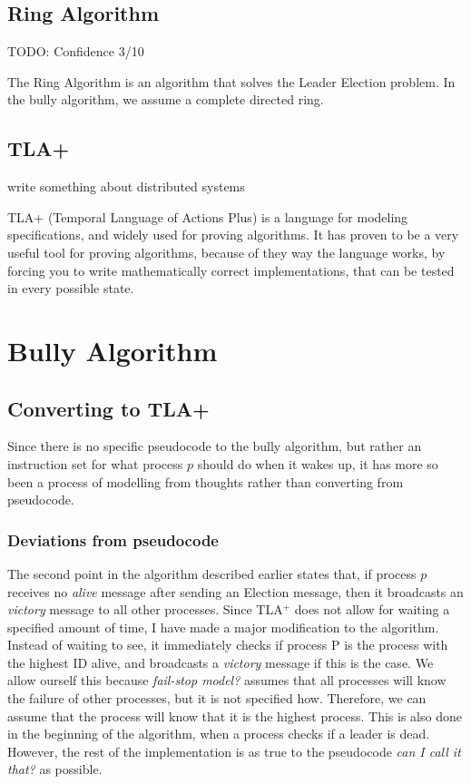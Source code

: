 \documentclass{report}
\begin{document}
\section{Ring Algorithm}
\begin{callout}
TODO: Confidence 3/10
\end{callout}

The Ring Algorithm is an algorithm that solves the Leader Election problem. In the bully algorithm, we assume a complete directed ring.


\section{TLA+}
\begin{callout}
  write something about distributed systems
\end{callout}

TLA+ (Temporal Language of Actions Plus) is a language for modeling specifications, and widely used for proving algorithms. It has proven to be a very useful tool for proving algorithms, because of they way the language works, by forcing you to write mathematically correct implementations, that can be tested in every possible state.

\chapter{Bully Algorithm}

\section{Converting to TLA+}
Since there is no specific pseudocode to the bully algorithm, but rather an instruction set for what process $p$ should do when it wakes up, it has more so been a process of modelling from thoughts rather than converting from pseudocode.

\subsection{Deviations from pseudocode}
The second point in the algorithm described earlier states that, if process $p$ receives no \textit{alive} message after sending an Election message, then it broadcasts an \textit{victory} message to all other processes. Since TLA$^{+}$ does not allow for waiting a specified amount of time, I have made a major modification to the algorithm. Instead of waiting to see, it immediately checks if process P is the process with the highest ID alive, and broadcasts a \textit{victory} message if this is the case. We allow ourself this because \textit{fail-stop model?} assumes that all processes will know the failure of other processes, but it is not specified how. Therefore, we can assume that the process will know that it is the highest process. This is also done in the beginning of the algorithm, when a process checks if a leader is dead. However, the rest of the implementation is as true to the pseudocode \textit{can I call it that?} as possible.
\end{document}
